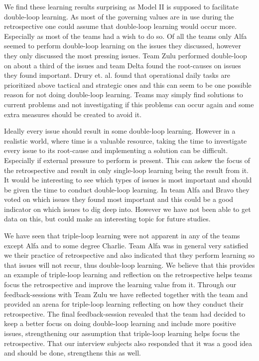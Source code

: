 We find these learning results surprising as Model II is supposed to facilitate double-loop learning. As most of the governing values are in use during the retrospective one could assume that double-loop learning would occur more. Especially as most of the teams had a wish to do so. Of all the teams only Alfa seemed to perform double-loop learning on the issues they discussed, however they only discussed the most pressing issues. Team Zulu performed double-loop on about a third of the issues and team Delta found the root-causes on issues they found important. Drury et. al. \cite{Drury2012} found that operational daily tasks are prioritized above tactical and strategic ones and this can seem to be one possible reason for not doing double-loop learning. Teams may simply find solutions to current problems and not investigating if this problems can occur again and some extra measures should be created to avoid it. 

Ideally every issue should result in some double-loop learning. However in a realistic world, where time is a valuable resource, taking the time to investigate every issue to its root-cause and implementing a solution can be difficult. Especially if external pressure to perform is present. This can askew the focus of the retrospective and result in only single-loop learning being the result from it. It would be interesting to see which types of issues is most important and should be given the time to conduct double-loop learning. In team Alfa and Bravo they voted on which issues they found most important and this could be a good indicator on which issues to dig deep into. However we have not been able to get data on this, but could make an interesting topic for future studies.

We have seen that triple-loop learning were not apparent in any of the teams except Alfa and to some degree Charlie. Team Alfa was in general very satisfied we their practice of retrospective and also indicated that they perform learning so that issues will not recur, thus double-loop learning. We believe that this provides an example of triple-loop learning and reflection on the retrospective helps teams focus the retrospective and improve the learning value from it. Through our feedback-sessions with Team Zulu we have reflected together with the team and provided an arena for triple-loop learning reflecting on how they conduct their retrospective. The final feedback-session revealed that the team had decided to keep a better focus on doing double-loop learning and include more positive issues, strengthening our assumption that triple-loop learning helps focus the retrospective. That our interview subjects also responded that it was a good idea and should be done, strengthens this as well.


